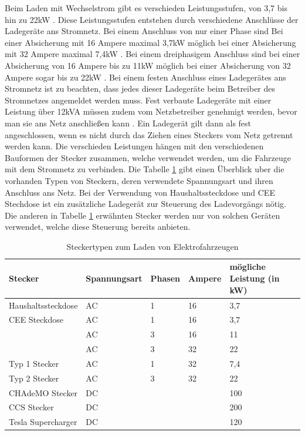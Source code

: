 Beim Laden mit Wechselstrom gibt es verschieden Leistungsstufen, von 3,7 bis hin zu 22kW \cite{laden_1}. Diese Leistungsstufen entstehen durch verschiedene Anschlüsse der Ladegeräte ans Stromnetz. Bei einem Anschluss von nur einer Phase sind Bei einer Absicherung mit 16 Ampere maximal 3,7kW möglich bei einer Absicherung mit 32 Ampere maximal 7,4kW \cite{laden_1}. Bei einem dreiphasigem Anschluss sind bei einer Absicherung von 16 Ampere bis zu 11kW möglich bei einer Absicherung von 32 Ampere sogar bis zu 22kW \cite{laden_1}. Bei einem festen Anschluss eines Ladegerätes ans Stromnetz ist zu beachten, dass jedes dieser Ladegeräte beim Betreiber des Stromnetzes angemeldet werden muss. Fest verbaute Ladegeräte mit einer Leistung über 12kVA müssen zudem vom Netzbetreiber genehmigt werden, bevor man sie ans Netz anschließen kann \cite{Lader_anschluss}. Ein Ladegerät gilt dann als fest angeschlossen, wenn es nicht durch das Ziehen eines Steckers vom Netz getrennt werden kann. Die verschieden Leistungen hängen mit den verschiedenen Bauformen der Stecker zusammen, welche verwendet werden, um die Fahrzeuge mit dem Stromnetz zu verbinden. Die Tabelle \ref{tab:table1} gibt einen Überblick uber die vorhanden Typen von Steckern, deren verwendete Spannungsart und ihren Anschluss ans Netz. Bei der Verwendung von Haushaltssteckdose und CEE Stechdose ist ein zusätzliche Ladegerät zur Steuerung des Ladevorgängs nötig. Die anderen in Tabelle \ref{tab:table1} erwähnten Stecker werden nur von solchen Geräten verwendet, welche diese Steuerung bereits anbieten.
\begin{table}[bh]
\begin{tabular}{|l|l|l|l|l|}
\hline
Stecker            & Spannungsart & Phasen & Ampere & mögliche Leistung (in kW) \\ \hline \hline
Haushaltssteckdose & AC           & 1      & 16     & 3,7                       \\ \hline
CEE Steckdose      & AC           & 1      & 16     & 3,7                       \\ \cline{2-5} 
                   & AC           & 3      & 16     & 11                        \\ \cline{2-5} 
                   & AC           & 3      & 32     & 22                        \\ \hline
Typ 1 Stecker      & AC           & 1      & 32     & 7,4                       \\ \hline
Typ 2 Stecker      & AC           & 3      & 32     & 22                        \\ \hline
CHAdeMO Stecker    & DC           &        &        & 100                       \\ \hline
CCS Stecker        & DC           &        &        & 200                       \\ \hline
Tesla Supercharger & DC           &        &        & 120                       \\ \hline
\end{tabular}
\caption{Steckertypen zum Laden von Elektrofahrzeugen}
\label{tab:table1}
\end{table}



